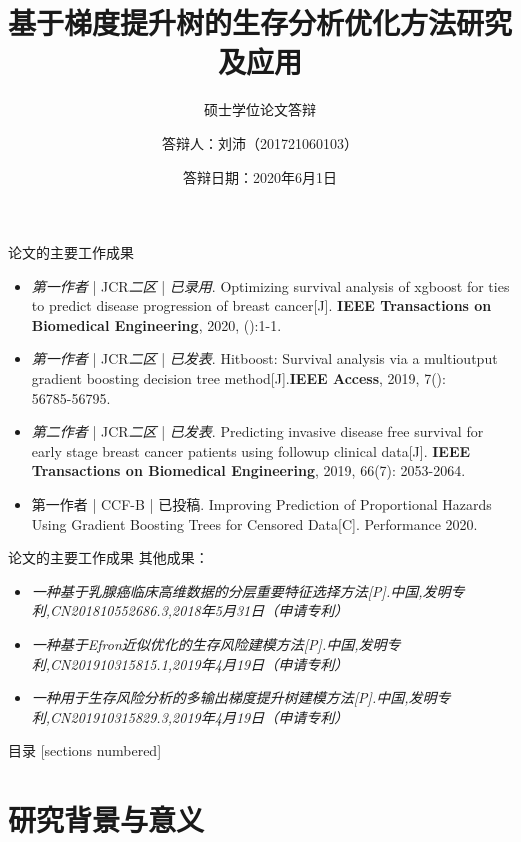 \documentclass[10pt]{beamer}
\title{基于梯度提升树的生存分析优化方法研究及应用}
\subtitle{硕士学位论文答辩}
\date{答辩日期：2020年6月1日}
\author{答辩人：刘沛（201721060103）}
\institute{电子科技大学计算机科学与工程学院}
\begin{document}
\maketitle

\begin{frame}{论文的主要工作成果}
  \begin{itemize}
  	\item \textit{第一作者} | JCR\textit{二区} | \textit{已录用}. Optimizing survival analysis of xgboost for ties to predict disease progression of breast cancer[J]. \textbf{IEEE Transactions on Biomedical Engineering}, 2020, ():1-1.
    \item \textit{第一作者} | JCR\textit{二区} | \textit{已发表}. Hitboost: Survival analysis via a multi­output gradient boosting decision tree method[J].\textbf{IEEE Access}, 2019, 7(): 56785­-56795.
    \item \textit{第二作者} | JCR\textit{二区} | \textit{已发表}. Predicting invasive disease­ free survival for early stage breast cancer patients using follow­up clinical data[J]. \textbf{IEEE Transactions on Biomedical Engineering}, 2019, 66(7): 2053­-2064.
    \item 第一作者 | CCF-B | 已投稿. Improving Prediction of Proportional Hazards Using Gradient Boosting Trees for Censored Data[C]. Performance 2020.
  \end{itemize}
\end{frame}

\begin{frame}{论文的主要工作成果}
  其他成果：
  \begin{itemize}
    \item \textit{一种基于乳腺癌临床高维数据的分层重要特征选择方法[P].中国,发明专利,CN201810552686.3,2018年5月31日（申请专利）}
    \item \textit{一种基于Efron近似优化的生存风险建模方法[P].中国,发明专利,CN201910315815.1,2019年4月19日（申请专利）}
    \item \textit{一种用于生存风险分析的多输出梯度提升树建模方法[P].中国,发明专利,CN201910315829.3,2019年4月19日（申请专利）}
  \end{itemize}
\end{frame}

\begin{frame}{目录}
  [sections numbered]
  \tableofcontents[hideallsubsections]
\end{frame}

\section{研究背景与意义}
\end{document}
